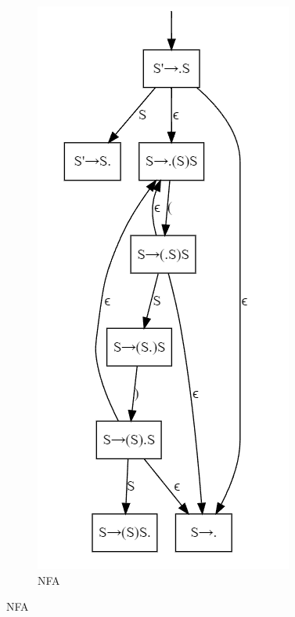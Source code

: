 \begin{figure}[!htb]
    \centering
    \begin{subfigure}{0.22\textwidth}
        \centering
        \includegraphics[height=2\textwidth]{pic/CP3/expnfa.png}
        \caption{NFA}

\end{subfigure}
\end{figure}
